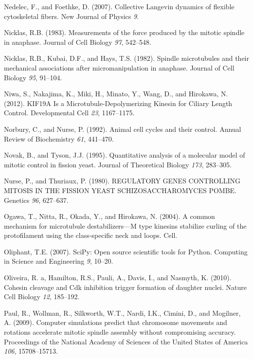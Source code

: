 \documentclass[12pt,a4paper,twoside,openright]{book}
\begin{document}
Nedelec, F., and Foethke, D. (2007). Collective Langevin dynamics of
flexible cytoskeletal fibers. New Journal of Physics \emph{9}.

Nicklas, R.B. (1983). Measurements of the force produced by the mitotic
spindle in anaphase. Journal of Cell Biology \emph{97}, 542--548.

Nicklas, R.B., Kubai, D.F., and Hays, T.S. (1982). Spindle microtubules
and their mechanical associations after micromanipulation in anaphase.
Journal of Cell Biology \emph{95}, 91--104.

Niwa, S., Nakajima, K., Miki, H., Minato, Y., Wang, D., and Hirokawa, N.
(2012). KIF19A Is a Microtubule-Depolymerizing Kinesin for Ciliary
Length Control. Developmental Cell \emph{23}, 1167--1175.

Norbury, C., and Nurse, P. (1992). Animal cell cycles and their control.
Annual Review of Biochemistry \emph{61}, 441--470.

Novak, B., and Tyson, J.J. (1995). Quantitative analysis of a molecular
model of mitotic control in fission yeast. Journal of Theoretical
Biology \emph{173}, 283--305.

Nurse, P., and Thuriaux, P. (1980). REGULATORY GENES CONTROLLING MITOSIS
IN THE FISSION YEAST SCHIZOSACCHAROMYCES POMBE. Genetics \emph{96},
627--637.

Ogawa, T., Nitta, R., Okada, Y., and Hirokawa, N. (2004). A common
mechanism for microtubule destabilizers---M type kinesins stabilize
curling of the protofilament using the class-specific neck and loops.
Cell.

Oliphant, T.E. (2007). SciPy: Open source scientific tools for Python.
Computing in Science and Engineering \emph{9}, 10--20.

Oliveira, R. a, Hamilton, R.S., Pauli, A., Davis, I., and Nasmyth, K.
(2010). Cohesin cleavage and Cdk inhibition trigger formation of
daughter nuclei. Nature Cell Biology \emph{12}, 185--192.

Paul, R., Wollman, R., Silkworth, W.T., Nardi, I.K., Cimini, D., and
Mogilner, A. (2009). Computer simulations predict that chromosome
movements and rotations accelerate mitotic spindle assembly without
compromising accuracy. Proceedings of the National Academy of Sciences
of the United States of America \emph{106}, 15708--15713.
\end{document}
